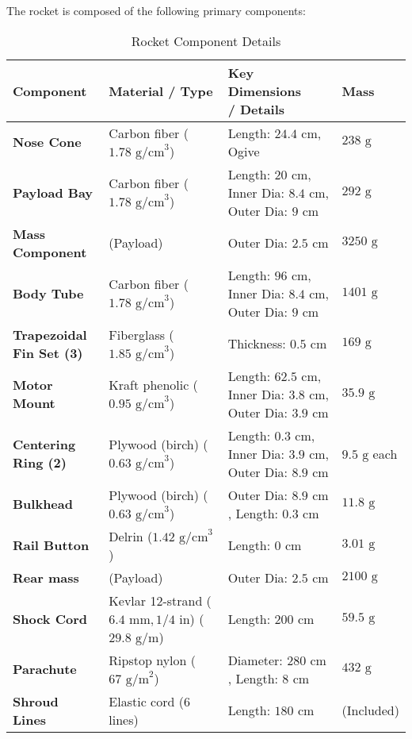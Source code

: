\documentclass[12pt, a4paper]{article}
\begin{document}
The rocket is composed of the following primary components:


\begin{longtable}{|L{3.7cm}|L{5cm}|L{5.5cm}|l|} %
    \caption{Rocket Component Details} \\
    \toprule
   \textbf{Component} & \textbf{Material / Type} & \textbf{Key Dimensions\newline/ Details} & \textbf{Mass} \\
    \midrule
    \endhead %
    \textbf{Nose Cone} & Carbon fiber ($1.78 \text{ g/cm}^3$) & Length: $24.4 \text{ cm}$, Ogive & $238 \text{ g}$ \\
    \textbf{Payload Bay} & Carbon fiber ($1.78 \text{ g/cm}^3$) & Length: $20 \text{ cm}$, Inner Dia: $8.4 \text{ cm}$, Outer Dia: $9 \text{ cm}$ & $292 \text{ g}$ \\
    \textbf{Mass Component} & (Payload) & Outer Dia: $2.5 \text{ cm}$ & $3250 \text{ g}$ \\
    \textbf{Body Tube} & Carbon fiber ($1.78 \text{ g/cm}^3$) & Length: $96 \text{ cm}$, Inner Dia: $8.4 \text{ cm}$, Outer Dia: $9 \text{ cm}$ & $1401 \text{ g}$ \\
    \textbf{Trapezoidal Fin Set (3)} & Fiberglass ($1.85 \text{ g/cm}^3$) & Thickness: $0.5 \text{ cm}$ & $169 \text{ g}$ \\
    \textbf{Motor Mount} & Kraft phenolic ($0.95 \text{ g/cm}^3$) & Length: $62.5 \text{ cm}$, Inner Dia: $3.8 \text{ cm}$, Outer Dia: $3.9 \text{ cm}$ & $35.9 \text{ g}$ \\
    \textbf{Centering Ring (2)} & Plywood (birch) ($0.63 \text{ g/cm}^3$) & Length: $0.3 \text{ cm}$, Inner Dia: $3.9 \text{ cm}$, Outer Dia: $8.9 \text{ cm}$ & $9.5 \text{ g}$ each \\
    \textbf{Bulkhead} & Plywood (birch) ($0.63 \text{ g/cm}^3$) & Outer Dia: $8.9 \text{ cm}$, Length: $0.3 \text{ cm}$ & $11.8 \text{ g}$ \\
    \textbf{Rail Button} & Delrin ($1.42 \text{ g/cm}^3$) & Length: $0 \text{ cm}$ & $3.01 \text{ g}$ \\
    \textbf{Rear mass} & (Payload) & Outer Dia: $2.5 \text{ cm}$ & $2100 \text{ g}$ \\
    \textbf{Shock Cord} & Kevlar 12-strand ($6.4 \text{ mm}, 1/4 \text{ in}$) ($29.8 \text{ g/m}$) & Length: $200 \text{ cm}$ & $59.5 \text{ g}$ \\
    \textbf{Parachute} & Ripstop nylon ($67 \text{ g/m}^2$) & Diameter: $280 \text{ cm}$, Length: $8 \text{ cm}$ & $432 \text{ g}$ \\
    \textbf{Shroud Lines} & Elastic cord (6 lines) & Length: $180 \text{ cm}$ & (Included) \\
    \bottomrule
\end{longtable}
\end{document}
